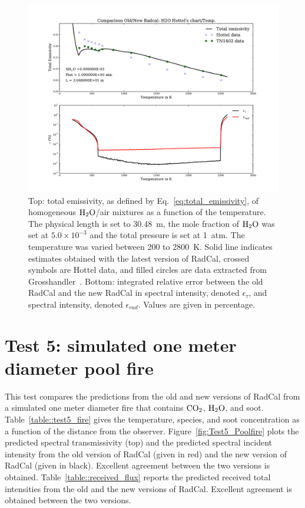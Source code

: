 \begin{figure}
\includegraphics[width=\textwidth]{Figures/Test4_H2O_Hottel.pdf}
\caption{Top: total emissivity, as defined by Eq.~\ref{eq:total_emissivity}, of homogeneous ${\rm H_2O}$/air mixtures as a function of the temperature. The physical length is set to 30.48~m, the mole fraction of ${\rm H_2O}$ was set at $5.0 \times 10^{-3}$ and the total pressure is set at 1~atm. The temperature was varied between 200 to 2800~K. Solid line indicates estimates obtained with the latest version of RadCal, crossed symbols are Hottel data, and filled circles are data extracted from Grosshandler~\cite{Grosshandler1993}. Bottom: integrated relative error between the old RadCal and the new RadCal in spectral intensity, denoted $\epsilon_{\tau}$, and spectral intensity, denoted $\epsilon_{rad}$. Values are given in percentage.\label{fig:Test4_H2O_Hottel}}
\end{figure}


\section{Test 5: simulated one meter diameter pool fire}

This test compares the predictions from the old and new versions of RadCal from a simulated one meter diameter fire that contains $\rm CO_2$, $\rm H_2O$, and soot. Table~\ref{table::test5_fire} gives the temperature, species, and soot concentration as a function of the distance from the observer. Figure~\ref{fig:Test5_Poolfire} plots the predicted spectral transmissivity (top) and the predicted spectral incident intensity from the old version of RadCal (given in red) and the new version of RadCal (given in black). Excellent agreement between the two versions is obtained. Table~\ref{table::received_flux} reports the predicted received total intensities from the old and the new versions of RadCal. Excellent agreement is obtained between the two versions.

